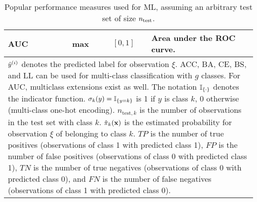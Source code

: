 \documentclass[landscape, 10pt, margin=0cm]{article}
\begin{document}
\begin{table}[h!]
\begin{tabular}{llcc p{9cm}}
AUC                       &                                                                                                               & max & $[0, 1]$      & Area under the ROC curve.\\
\bottomrule
\multicolumn{5}{p{22.5cm}}{\footnotesize{$\hat{y}^{(i)}$ denotes the predicted label for observation $\xi$. ACC, BA, CE, BS, and LL can be used for multi-class classification with $g$ classes. For AUC, multiclass extensions exist as well. The notation $\mathbb{I}_{\{\cdot\}}$ denotes the indicator function. $\sigma_k(y) = \mathbb{I}_{\{y = k\}}$ is 1 if $y$ is class $k$, 0 otherwise (multi-class one-hot encoding). $n_{\text{test},k}$ is the number of observations in the test set with class $k$. $\hat \pi_{k}(\mathbf{x})$ is the estimated probability for observation $\xi$ of belonging to class $k$. $TP$ is the number of true positives (observations of class 1 with predicted class 1), $FP$ is the number of false positives (observations of class 0 with predicted class 1), $TN$ is the number of true negatives (observations of class 0 with predicted class 0), and $FN$ is the number of false negatives (observations of class 1 with predicted class 0).}}
\end{tabular}
\caption{Popular performance measures used for ML, assuming an arbitrary test set of size $n_{\mathrm{test}}$.}
\label{tab:measures}
\end{table}
\end{document}
